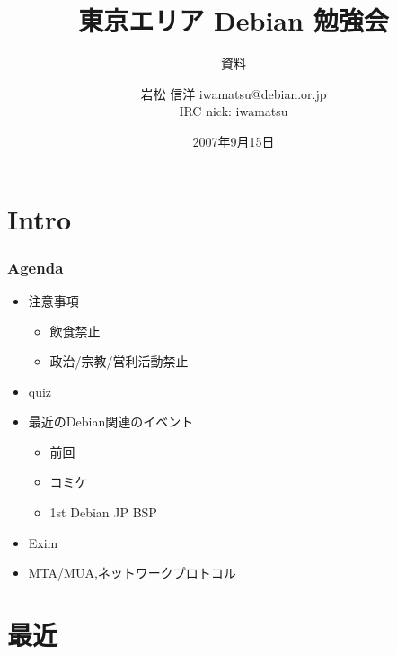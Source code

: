 \documentclass[cjk,dvipdfmx,12pt]{beamer}
\title{東京エリア Debian 勉強会}
\subtitle{資料}
\author{岩松 信洋 iwamatsu@debian.or.jp\\IRC nick: iwamatsu}
\date{2007年9月15日}
\begin{document}
\frame{\titlepage{}}

\section{Intro}

\begin{frame}
 \frametitle{Agenda}
\begin{minipage}[t]{0.45\hsize}
  \begin{itemize}
  \item 注意事項
	\begin{itemize}
	 \item 飲食禁止
	 \item 政治/宗教/営利活動禁止
	\end{itemize}
  \item quiz
  \item 最近のDebian関連のイベント
	\begin{itemize}
	 \item 前回
	 \item コミケ
	 \item 1st Debian JP BSP
	\end{itemize}
 \end{itemize}
\end{minipage}
\begin{minipage}[t]{0.45\hsize}
 \begin{itemize}
  \item Exim
  \item MTA/MUA,ネットワークプロトコル
 \end{itemize}
\end{minipage}
\end{frame}

\section{最近}
\end{document}
